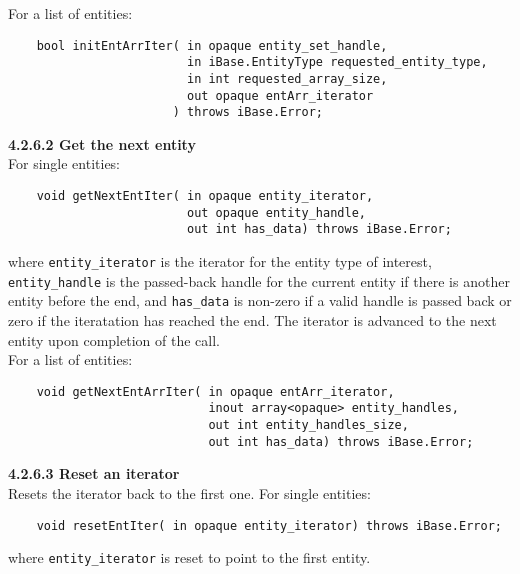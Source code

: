 \documentclass{article}
\begin{document}
\hspace{-16pt}For a list of entities:

\begin{verbatim}
    bool initEntArrIter( in opaque entity_set_handle, 
                         in iBase.EntityType requested_entity_type, 
                         in int requested_array_size, 
                         out opaque entArr_iterator
                       ) throws iBase.Error;
\end{verbatim}

\hspace{-16pt}\textbf{4.2.6.2 Get the next entity}\\

\hspace{-16pt}For single entities:\\

\begin{verbatim}
    void getNextEntIter( in opaque entity_iterator,
                         out opaque entity_handle,
                         out int has_data) throws iBase.Error;
\end{verbatim}
where {\tt entity\_iterator} is the iterator for the entity 
type of interest, {\tt entity\_handle} is 
the passed-back handle for the current entity if there is another
entity before the end, and {\tt has\_data} is non-zero if a valid
handle is passed back or zero if the iteratation has reached the
end. The iterator is advanced to the next entity upon completion of 
the call.\\

\hspace{-16pt}For a list of entities:

\begin{verbatim}
    void getNextEntArrIter( in opaque entArr_iterator,
                            inout array<opaque> entity_handles,
                            out int entity_handles_size,
                            out int has_data) throws iBase.Error;
\end{verbatim}

\hspace{-16pt}\textbf{4.2.6.3 Reset an iterator}\\


\hspace{-16pt}Resets the iterator back to the first one. For single entities:

\begin{verbatim}    
    void resetEntIter( in opaque entity_iterator) throws iBase.Error;
\end{verbatim}
where {\tt entity\_iterator} is reset to point to the 
first entity.\\
\end{document}
